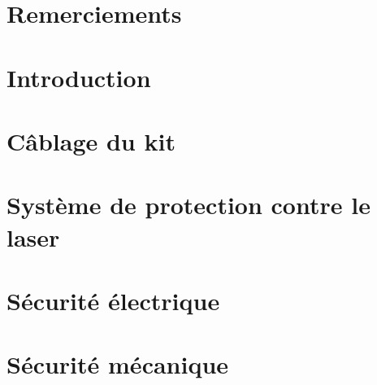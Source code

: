\documentclass[
    iai, %
    eai, %
    confidential, %
]{heig-tb}
\begin{document}
\maketitle
\frontmatter
\clearemptydoublepage

\preamble
\authentification
\chapter*{Remerciements}


\begin{abstract}
    
\end{abstract}

\clearemptydoublepage
{
    \tableofcontents
    \let\cleardoublepage\clearpage
    \listoffigures
    \let\cleardoublepage\clearpage
    \listoftables
    \let\cleardoublepage\clearpage
}

\printnomenclature
\clearemptydoublepage
{}

\mainmatter
\chapter{Introduction}

% 
\chapter{Câblage du kit}

\chapter*{Système de protection contre le laser}


\chapter{Sécurité électrique} \label{chapter:securite_electrique}

\chapter{Sécurité mécanique} \label{chapter:securite_mecanique}

\end{document}
